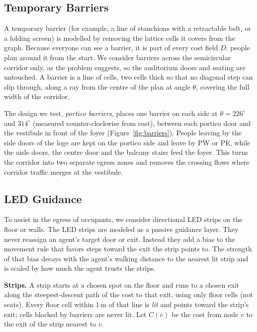 \documentclass{article}
\begin{document}
\subsection{Temporary Barriers}
\label{sec:barriers}
A temporary barrier (for example, a line of stanchions with a retractable belt, or a folding screen) is modelled by removing the lattice cells it covers from the graph. Because everyone can see a barrier, it is part of every cost field $D$: people plan around it from the start. We consider barriers across the semicircular corridor only, as the problem suggests, so the auditorium doors and seating are untouched. A barrier is a line of cells, two cells thick so that no diagonal step can slip through, along a ray from the centre of the plan at angle $\theta$, covering the full width of the corridor.

The design we test, \emph{portico barriers}, places one barrier on each side at $\theta = 226^\circ$ and $314^\circ$ (measured counter-clockwise from east), between each portico door and the vestibule in front of the foyer (Figure~\ref{fig:barriers}). People leaving by the side doors of the loge are kept on the portico side and leave by PW or PE, while the aisle doors, the centre door and the balcony stairs feed the foyer. This turns the corridor into two separate egress zones and removes the crossing flows where corridor traffic merges at the vestibule.

\subsection{LED Guidance}
\label{sec:led}

To assist in the egress of occupants, we consider directional LED strips on the floor or walls. The LED strips are modeled as a passive guidance layer. They never reassign an agent's target door or exit. Instead they add a bias to the movement rule that favors steps toward the exit the strip points to. The strength of that bias decays with the agent's walking distance to the nearest lit strip and is scaled by how much the agent trusts the strips.

\textbf{Strips.} A strip starts at a chosen spot on the floor and runs to a chosen exit along the steepest-descent path of the cost to that exit, using only floor cells (not seats). Every floor cell within 1\,m of that line is \emph{lit} and points toward the strip's exit; cells blocked by barriers are never lit. Let $C(v)$ be the cost from node $v$ to the exit of the strip nearest to $v$.
\end{document}
